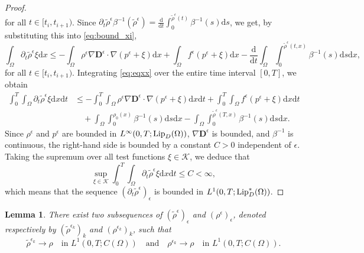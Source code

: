 \documentclass[final,reqno]{amsart}
\theoremstyle{plain}
\newtheorem{lemma}{Lemma}	%
\theoremstyle{definition}
\theoremstyle{remark}
\numberwithin{remark}{section}	%
\numberwithin{example}{section}	%
\newcommand{\de}{\mathbf{D}}
\newcommand{\K}{\mathcal K}
\newcommand{\Om}{\Omega}
\newcommand{\Lip}{\textup{Lip}}
\newcommand{\dd}{\mathrm{d}}
\begin{document}
\begin{proof}
\begin{equation}
    \end{equation}
    for all  $t \in [t_i, t_{i+1})$.
    Since $\partial_t \tilde{\rho}^{\epsilon} \beta^{-1}(\tilde{\rho}^{\epsilon}) = \frac{\dd}{\dd t} \int_{0}^{\tilde{\rho}^{\epsilon}(t)} \beta^{-1}(s) \dd s$, we get, by substituting this into \eqref{eq:bound_xi},
    \begin{equation}\label{eq:eqxx}
        \int_{\Omega} \partial_t \tilde{\rho}^{\epsilon} \xi \dd x \leq -\int_{\Omega} \rho^\epsilon \nabla \de^\epsilon \cdot \nabla(p^\epsilon +\xi) \dd x + \int_{\Omega} f^{\epsilon} (p^{\epsilon}+\xi) \dd x - \frac{\dd}{\dd t} \int_{\Omega} \int_{0}^{\tilde{\rho}^{\epsilon}(t, x)} \beta^{-1}(s) \dd s \dd x, 
    \end{equation}
    for all $t \in [t_i, t_{i+1})$.
    Integrating \eqref{eq:eqxx} over the entire time interval $[0,T]$, we obtain
    \begin{equation*}
        \begin{aligned}
            \int_{0}^{T}\int_{\Omega} \partial_t \tilde{\rho}^{\epsilon} \xi \dd x \dd t 
            &\leq -\int_{0}^{T} \int_{\Omega} \rho^\epsilon \nabla \de^\epsilon \cdot \nabla(p^\epsilon +\xi) \dd x \dd t + \int_{0}^{T}\int_{\Omega} f^{\epsilon} (p^{\epsilon}+\xi) \dd x \dd t \\
            &\quad + \int_{\Omega}\int_{0}^{\rho_0(x)} \beta^{-1}(s)\dd s \dd x - \int_{\Omega} \int_{0}^{\tilde{\rho}^\epsilon(T, x)} \beta^{-1}(s) \dd s \dd x.
        \end{aligned}
    \end{equation*}
    Since $\rho^\epsilon$ and $p^\epsilon$ are bounded in $L^{\infty}(0,T; \Lip_{D}(\Omega))$, $\nabla \de^\epsilon$ is bounded, and $\beta^{-1}$ is continuous, the right-hand side is bounded by a constant $C > 0$ independent of $\epsilon$. Taking the supremum over all test functions $\xi \in \K$, we deduce that
    \begin{equation}
        \sup_{\xi \in \K} \int_{0}^{T} \int_{\Omega} \partial_t \tilde{\rho}^{\epsilon} \xi \dd x \dd t \leq C < \infty,
    \end{equation}
    which means that the sequence $(\partial_t \tilde{\rho}^{\epsilon})_{\epsilon}$ is bounded in $L^1(0,T; \Lip_{D}^*(\Om))$.
\end{proof}
	\begin{lemma}\label{lem:rhoep}
    There exist two subsequences of $(\tilde{\rho}^{\epsilon})_{\epsilon}$ and $(\rho^{\epsilon})_{\epsilon}$, denoted respectively by $(\tilde{\rho}^{\epsilon_k})_{k}$ and $(\rho^{\epsilon_k})_{k}$, such that 	
    \[
        \tilde{\rho}^{\epsilon_k} \to \rho \quad \text{in } L^1(0,T; C(\Omega)) \quad \text{and} \quad \rho^{\epsilon_k} \to \rho \quad \text{in } L^1(0,T; C(\Omega)).
    \]
\end{lemma}
\end{document}
